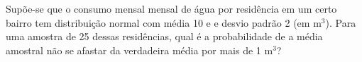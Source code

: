 %
%


\begin{exercicioBanco}[\valorquestao]
Supõe-se que o consumo mensal mensal de água por residência em um certo bairro tem distribuição normal com média 10 e e desvio padrão 2 (em m\(^{3}\)). Para uma amostra de 25 dessas residências, qual é a probabilidade de a média amostral não se afastar da verdadeira média por mais de 1 m\(^{3}\)?
\end{exercicioBanco}

